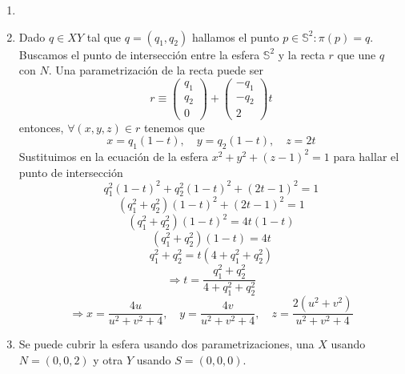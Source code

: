\begin{sol}
  \begin{enumerate}[label=(\roman*)]
    \item []
    \item Dado $q \in XY$ tal que $q = (q_{1}, q_{2})$ hallamos el punto $p \in \mathbb{S}^{2} : \pi(p) = q$. Buscamos el punto de intersección entre la esfera $\mathbb{S}^{2}$ y la recta $r$ que une $q$ con $N$. Una parametrización de la recta puede ser
      \[ 
        r \equiv 
        \begin{pmatrix}
          q_{1} \\
          q_{2} \\
          0
        \end{pmatrix}
        +
        \begin{pmatrix}
          -q_{1} \\
          -q_{2} \\
          2
        \end{pmatrix}
        t
      \] 
      entonces, $\forall (x, y, z) \in r$ tenemos que
      \[ 
        x = q_{1}(1-t), \quad y = q_{2}(1-t), \quad z = 2t 
      \] 
      Sustituimos en la ecuación de la esfera $x^{2} + y^{2} + (z-1)^{2} = 1$ para hallar el punto de intersección
      \[ 
        q_{1}^{2}(1-t)^{2} + q_{2}^{2}(1-t)^{2} + (2t - 1)^{2} = 1 
      \] 
      \[ 
        (q_{1}^{2} + q_{2}^{2})(1-t)^{2} + (2t -1)^{2} = 1 
      \] 
      \[ 
        (q_{1}^{2} + q_{2}^{2})(1-t)^{2} = 4t(1 - t)
      \] 
      \[ 
        (q_{1}^{2} + q_{2}^{2})(1-t) = 4t
      \] 
      \[ 
        q_{1}^{2} + q_{2}^{2} = t(4 + q_{1}^{2} + q_{2}^{2})
      \] 
      \[ 
        \Rightarrow t = \frac{q_{1}^{2} + q_{2}^{2}}{4 + q_{1}^{2} + q_{2}^{2}} 
      \] 
      \[ 
        \Rightarrow x = \frac{4u}{u^{2} + v^{2} + 4}, \quad y = \frac{4v}{u^{2} + v^{2} + 4}, \quad z = \frac{2(u^{2} + v^{2})}{u^{2} + v^{2} + 4}
      \] 

    \item Se puede cubrir la esfera usando dos parametrizaciones, una $X$ usando $N = (0,0,2)$ y otra $Y$ usando $S = (0, 0, 0)$.

  \end{enumerate}
\end{sol}
